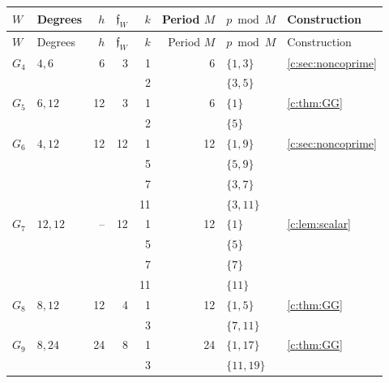\documentclass[10pt,a4paper]{amsart}
\theoremstyle{definition}
\begin{document}
\clearpage
\begingroup\small%
\begingroup\setlength{\tabcolsep}{3pt}
\begin{longtable}{@{}lL{.24\textwidth}rrrrL{.26\textwidth}L{.14\textwidth}@{}}
\toprule $W$ & Degrees & $h$ & $\mathfrak f_W$ & $k$ & Period $M$ & $p\bmod M$ & Construction\\\midrule
\endfirsthead
\toprule $W$ & Degrees & $h$ & $\mathfrak f_W$ & $k$ & Period $M$ & $p\bmod M$ & Construction\\\midrule
\endhead
\bottomrule\endfoot
\endlastfoot
$G_{4}$ & $4,\allowbreak 6$ & 6 & 3 & 1 & 6 & $\{1,\allowbreak 3\}$ & \cref{c:sec:noncoprime} \\*
 &  &  &  & 2 &  & $\{3,\allowbreak 5\}$ &  \\
\midrule[.25pt]
$G_{5}$ & $6,\allowbreak 12$ & 12 & 3 & 1 & 6 & $\{1\}$ & \cref{c:thm:GG} \\*
 &  &  &  & 2 &  & $\{5\}$ &  \\
\midrule[.25pt]
$G_{6}$ & $4,\allowbreak 12$ & 12 & 12 & 1 & 12 & $\{1,\allowbreak 9\}$ & \cref{c:sec:noncoprime} \\*
 &  &  &  & 5 &  & $\{5,\allowbreak 9\}$ &  \\*
 &  &  &  & 7 &  & $\{3,\allowbreak 7\}$ &  \\*
 &  &  &  & 11 &  & $\{3,\allowbreak 11\}$ &  \\
\midrule[.25pt]
$G_{7}$ & $12,\allowbreak 12$ & -- & 12 & 1 & 12 & $\{1\}$ & \cref{c:lem:scalar} \\*
 &  &  &  & 5 &  & $\{5\}$ &  \\*
 &  &  &  & 7 &  & $\{7\}$ &  \\*
 &  &  &  & 11 &  & $\{11\}$ &  \\
\midrule[.25pt]
$G_{8}$ & $8,\allowbreak 12$ & 12 & 4 & 1 & 12 & $\{1,\allowbreak 5\}$ & \cref{c:thm:GG} \\*
 &  &  &  & 3 &  & $\{7,\allowbreak 11\}$ &  \\
\midrule[.25pt]
$G_{9}$ & $8,\allowbreak 24$ & 24 & 8 & 1 & 24 & $\{1,\allowbreak 17\}$ & \cref{c:thm:GG} \\*
 &  &  &  & 3 &  & $\{11,\allowbreak 19\}$ &  \\*

\end{longtable}
\end{document}
